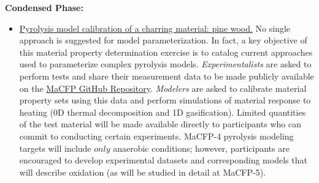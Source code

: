 \documentclass[12pt]{article}
\begin{document}
\textbf{Condensed Phase:}
\begin{itemize} [noitemsep]
    \item \underline{Pyrolysis model calibration of a charring material: pine wood.}
    No single approach is suggested for model parameterization. In fact, a key objective of this material property determination exercise is to catalog current approaches used to parameterize complex pyrolysis models. \emph{Experimentalists} are asked to perform tests and share their measurement data to be made publicly available on the \href{https://github.com/MaCFP/matl-db/tree/master/Wood}{MaCFP GitHub Repository}. \emph{Modelers} are asked to calibrate material property sets using this data and perform simulations of material response to heating (0D thermal decomposition and 1D gasification). Limited quantities of the test material will be made available directly to participants who can commit to conducting certain experiments. MaCFP-4 pyrolysis modeling targets will include $only$ anaerobic conditions; however, participants are encouraged to develop experimental datasets and corresponding models that will describe oxidation (as will be studied in detail at MaCFP-5).\\
\end{itemize}
\end{document}
